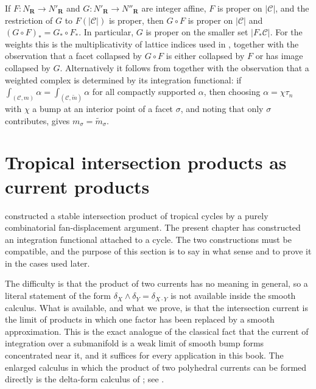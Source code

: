 \begin{remark}[Functoriality]
\label{rem:ch11-pushforward-functorial}
If $F:N_{\mathbf R}\to N'_{\mathbf R}$ and $G:N'_{\mathbf R}\to
N''_{\mathbf R}$ are integer affine, $F$ is proper on $|\mathscr C|$, and
the restriction of $G$ to $F(|\mathscr C|)$ is proper, then $G\circ F$ is
proper on $|\mathscr C|$ and $(G\circ F)_*=G_*\circ F_*$.  In particular,
$G$ is proper on the smaller set $|F_*\mathscr C|$.  For the weights this is the
multiplicativity of lattice indices used in
, together with the observation
that a facet collapsed by $G\circ F$ is either collapsed by $F$ or has
image collapsed by $G$.  Alternatively it follows from
 together with the observation that a
weighted complex is determined by its integration functional: if
$\int_{(\mathscr C,m)}\alpha=\int_{(\mathscr C,\tilde m)}\alpha$ for all
compactly supported $\alpha$, then choosing $\alpha=\chi\tau_n$ with $\chi$
a bump at an interior point of a facet $\sigma$, and noting that only
$\sigma$ contributes, gives $m_\sigma=\tilde m_\sigma$.
\end{remark}

\section{Tropical intersection products as current products}
\label{sec:ch11-tropical-intersection}

 constructed a stable intersection product of
tropical cycles by a purely combinatorial fan-displacement argument.  The
present chapter has constructed an integration functional attached to a
cycle.  The two constructions must be compatible, and the purpose of this
section is to say in what sense and to prove it in the cases used later.

The difficulty is that the product of two currents has no meaning in
general, so a literal statement of the form
$\delta_X\wedge\delta_Y=\delta_{X\cdot Y}$ is not available inside the smooth
calculus.  What is available, and what we prove, is that the intersection
current is the limit of products in which one factor has been replaced by a
smooth approximation.  This is the exact analogue of the classical fact that
the current of integration over a submanifold is a weak limit of smooth
bump forms concentrated near it, and it suffices for every application in
this book.  The enlarged calculus in which the product of two polyhedral
currents can be formed directly is the delta-form calculus of
; see .

